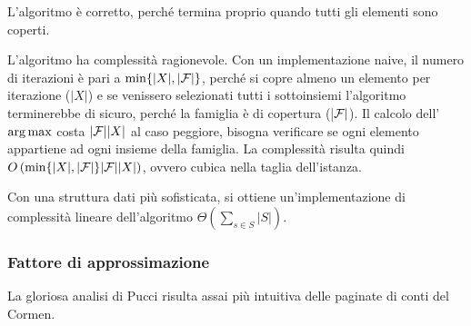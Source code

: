 L'algoritmo è corretto, perché termina proprio quando tutti gli elementi sono coperti.

L'algoritmo ha complessità ragionevole. Con un implementazione naive, il numero di iterazioni è pari a $
\min \{ |X|, |\mathcal{F}| \}
$, perché si copre almeno un elemento per iterazione ($|X|$) e se venissero selezionati tutti i sottoinsiemi l'algoritmo terminerebbe di sicuro, perché la famiglia è di copertura (|$\mathcal{F}|$).
Il calcolo dell'$\operatorname*{arg\,max}$ costa $|\mathcal{F}||X|$ al caso peggiore, bisogna verificare se ogni elemento appartiene ad ogni insieme della famiglia.
La complessità risulta quindi $
O \left( 
\min \{ |X|, |\mathcal{F}| \}
|\mathcal{F}||X|
\right)
$, ovvero cubica nella taglia dell'istanza.

Con una struttura dati più sofisticata, si ottiene un'implementazione di complessità lineare dell'algoritmo
$
\Theta \left( 
    \sum_{s \in S}^{} |S|
\right)
$.

\subsubsection{Fattore di approssimazione}

La gloriosa analisi di Pucci risulta assai più intuitiva delle paginate di conti del Cormen.

